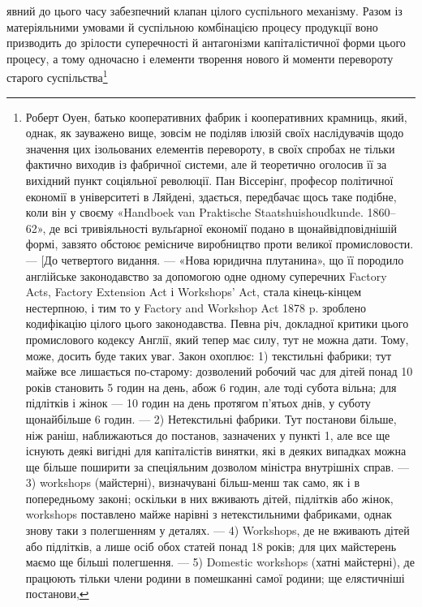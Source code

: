 \parcont{}  %
явний до цього часу забезпечний клапан цілого суспільного
механізму. Разом із матеріяльними умовами й суспільною комбінацією
процесу продукції воно призводить до зрілости суперечності
й антагонізми капіталістичної форми цього процесу,
а тому одночасно і елементи творення нового й моменти перевороту
старого суспільства\footnote{
Роберт Оуен, батько кооперативних фабрик і кооперативних
крамниць, який, однак, як зауважено вище, зовсім не поділяв ілюзій
своїх наслідувачів щодо значення цих ізольованих елементів перевороту,
в своїх спробах не тільки фактично виходив із фабричної системи,
але й теоретично оголосив її за вихідний пункт соціяльної революції.
Пан Віссерінґ, професор політичної економії в університеті в Ляйдені,
здається, передбачає щось таке подібне, коли він у своєму «Handboek
van Praktische Staatshuishoudkunde. 1860--62», де всі тривіяльності
вульґарної економії подано в щонайвідповіднішій формі, завзято обстоює
ремісниче виробництво проти великої промисловости. — [До четвертого видання.
— «Нова юридична плутанина», що її породило англійське законодавство
за допомогою одне одному суперечних Factory Acts, Factory
Extension Act і Workshops’ Act, стала кінець-кінцем нестерпною, і
тим то у Factory and Workshop Act 1878 p. зроблено кодифікацію цілого
цього законодавства. Певна річ, докладної критики цього промислового
кодексу Англії, який тепер має силу, тут не можна дати. Тому, може,
досить буде таких уваг. Закон охоплює: 1) текстильні фабрики; тут
майже все лишається по-старому: дозволений робочий час для дітей
понад 10 років становить 5 годин на день, абож 6 годин, але тоді субота
вільна; для підлітків і жінок — 10 годин на день протягом п’ятьох
днів, у суботу щонайбільше 6 годин. — 2) Нетекстильні фабрики. Тут
постанови більше, ніж раніш, наближаються до постанов, зазначених у
пункті 1, але все ще існують деякі вигідні для капіталістів винятки, які
в деяких випадках можна ще більше поширити за спеціяльним дозволом
міністра внутрішніх справ. — 3) workshops (майстерні), визначувані
більш-менш так само, як і в попередньому законі; оскільки в них вживають
дітей, підлітків або жінок, workshops поставлено майже нарівні
з нетекстильними фабриками, однак знову таки з полегшенням у деталях.
— 4) Workshops, де не вживають дітей або підлітків, а лише осіб
обох статей понад 18 років; для цих майстерень маємо ще більші полегшення.
— 5) Domestic workshops (хатні майстерні), де працюють тільки
члени родини в помешканні самої родини; ще елястичніші постанови,
}
